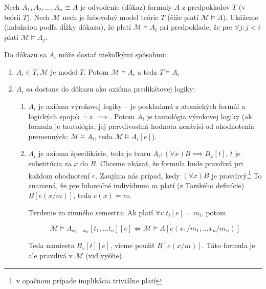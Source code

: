 \begin{dokaz}
    Nech $A_1, A_2, \ldots, A_n\equiv A$ je odvodenie (dôkaz) formuly $A$
    z predpokladov $T$ (v teórii $T$).
    Nech $\mathcal{M}$ nech je ľubovoľný model teórie $T$ 
    (čiže platí $\mathcal{M} \models A$).
    Ukážeme (indukciou podľa dĺžky dôkazu), že platí $\mathcal{M} \models A_i$
    pri predpoklade, že pre $\forall j:j < i$ platí $\mathcal{M} \models A_j$.

    Do dôkazu sa $A_i$ môže dostať niekoľkými spôsobmi:
    \begin{enumerate}
    \item $A_i \in T, \mathcal{M}$ je model $T$. Potom 
        $\mathcal{M} \models A_i$ a teda $T \models A_i$

    \item $A_i$ sa dostane do dôkazu ako axióma predikátovej logiky:
    \begin{enumerate}
        \item $A_i$ je axióma výrokovej logiky -- je poskladaná z
            atomických formúl a logických spojok $\neg$ a $\implies$. Potom
            $A_i$ je tautológia výrokovej logiky (ak formula je tautológia,
            jej pravdivostná hodnota nezávisi od ohodnotenia
            premenných:
            $\mathcal{M} \models A_i$, teda $\mathcal{M} \models A_i[e]$).

        \item $A_i$ je axioma špecifikácie, teda je tvaru 
            $A_i: (\forall x) B \implies B_x[t]$, 
            $t$ je substitúcia za $x$ do $B$. 
            Chceme ukázať, že formula bude pravdivá
            pri každom ohodnotení $e$.
            Zaujíma nás prípad, kedy $(\forall x) B$ je pravdivý.\footnote{
                v opačnom prípade implikácia triviálne platí}
            To znamená, že pre ľubovoľné indivíduum $m$ platí (z Tarského
            definície) $B[e(x/m)]$, teda $e(x)=m$.
        
            Tvrdenie zo zimného semestra: Ak platí
              $\forall i: t_i[e] = m_i$, potom

            \begin{equation*}
                \mathcal{M} \models A_{x_1, \ldots x_n}[t_1, \ldots t_n][e] 
                    \iff
                \mathcal{M} \models A[e(x_1/m_1, \ldots x_n/m_n)]
            \end{equation*}

            Teda namiesto $B_x[t][e]$, vieme použiť $B[e(x/m)]$.
            Táto formula je ale pravdivá v $\mathcal{M}$ (viď vyššie).


\end{enumerate}
\end{enumerate}
\end{dokaz}
